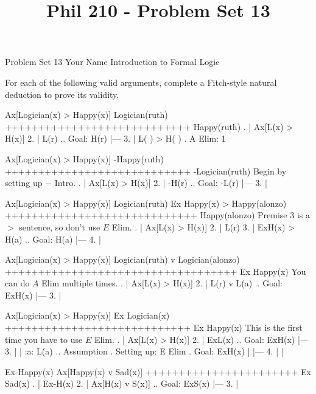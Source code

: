
\title{Phil 210 - Problem Set 13}

\heading
Problem Set 13
Your Name
Introduction to Formal Logic
\endheading

For each of the following valid arguments, complete a Fitch-style natural deduction to prove its validity.

\quantifiers
\problems
{}
\argument
 Ax[Logician(x) > Happy(x)]
 Logician(ruth) 
++++++++++++++++++++++++++++
 Happy(ruth) 
\endargument
        \answer
        . | Ax[L(x) > H(x)]
         2. | L(r)             ..  Goal: H(r)
            |---
         3. | L( ) > H( )      .  A Elim: 1
        \endfitchproof
        \endanswer

\argument
 Ax[Logician(x) > Happy(x)]
 -Happy(ruth) 
++++++++++++++++++++++++++++
 -Logician(ruth) 
\endargument
\Hint Begin by setting up $-$ Intro.
        \answer
        . | Ax[L(x) > H(x)]
         2. | -H(r)             ..  Goal: -L(r)
            |---
         3. | 
        \endfitchproof
        \endanswer

\argument
 Ax[Logician(x) > Happy(x)]
 Logician(ruth)
 Ex Happy(x) > Happy(alonzo)
+++++++++++++++++++++++++++++
 Happy(alonzo) 
\endargument
\Hint Premise 3 is a $>$ sentence, so don't use $E$ Elim.
        \answer
        . | Ax[L(x) > H(x)]
         2. | L(r)
         3. | ExH(x) > H(a)    ..  Goal: H(a)
            |---
         4. |
        \endfitchproof
        \endanswer

\argument
 Ax[Logician(x) > Happy(x)]
 Logician(ruth) v Logician(alonzo)
+++++++++++++++++++++++++++++++++++
 Ex Happy(x)
\endargument
\Hint You can do $A$ Elim multiple times.
        \answer
        . | Ax[L(x) > H(x)]
         2. | L(r) v L(a)      ..  Goal: ExH(x)
            |---
         3. | 
        \endfitchproof
        \endanswer

\argument
 Ax[Logician(x) > Happy(x)]
 Ex Logician(x)
++++++++++++++++++++++++++++
 Ex Happy(x)
\endargument
\Hint This is the first time you have to use $E$ Elim.
        \answer
        . | Ax[L(x) > H(x)]
         2. | ExL(x)           ..  Goal: ExH(x)
            |---
         3. |   | :a: L(a)     ..  Assumption  .  Setting up: E Elim  .  Goal: ExH(x)
            |   |---
         4. |   |
        \endfitchproof
        \endanswer

\argument
 Ex-Happy(x)
 Ax[Happy(x) v Sad(x)]
+++++++++++++++++++++++
 Ex Sad(x)
\endargument
        \answer
        . | Ex-H(x)
         2. | Ax[H(x) v S(x)]  ..  Goal: ExS(x)
            |---
         3. | 
        \endfitchproof
        \endanswer

\endproblems
\bye
